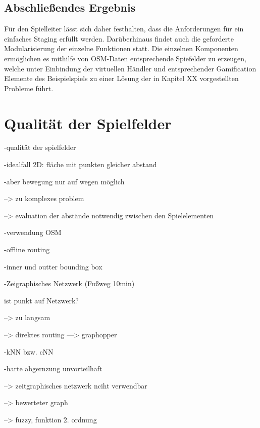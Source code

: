\subsection*{Abschließendes Ergebnis}

Für den Spielleiter lässt sich daher festhalten, dass die Anforderungen für ein einfaches Staging erfüllt werden. Darüberhinaus findet auch die geforderte Modularisierung der einzelne Funktionen statt. Die einzelnen Komponenten ermöglichen es mithilfe von OSM-Daten entsprechende Spiefelder zu erzeugen, welche unter Einbindung der virtuellen Händler und entsprechender Gamification Elemente des Beispielspiels zu einer Lösung der in Kapitel XX vorgestellten Probleme führt.


\section{Qualität der Spielfelder}
\label{ch:CH6_qualtiy_of_gameboards}

-qualität der spielfelder

-idealfall 2D: fläche mit punkten gleicher abstand

-aber bewegung nur auf wegen möglich

--> zu komplexes problem

--> evaluation der abstände notwendig zwischen den Spielelementen

-verwendung OSM

-offline routing

-inner und outter bounding box

-Zeigraphisches Netzwerk (Fußweg 10min)

ist punkt auf Netzwerk?

--> zu langsam

--> direktes routing ---> graphopper

-kNN bzw. cNN

-harte abgernzung unvorteilhaft

--> zeitgraphisches netzwerk nciht verwendbar

--> bewerteter graph

--> fuzzy, funktion 2. ordnung